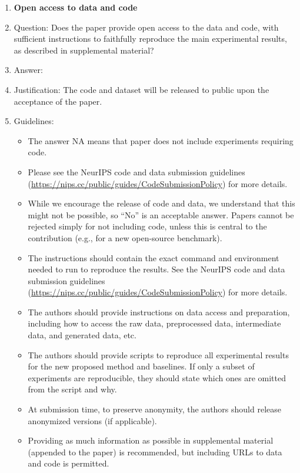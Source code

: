 \documentclass{article}
\begin{document}
\begin{enumerate}
\item {\bf Open access to data and code}
    \item[] Question: Does the paper provide open access to the data and code, with sufficient instructions to faithfully reproduce the main experimental results, as described in supplemental material?
    \item[] Answer: \answerNo{} %
    \item[] Justification: The code and dataset will be released to public upon the acceptance of the paper.
    \item[] Guidelines:
    \begin{itemize}
        \item The answer NA means that paper does not include experiments requiring code.
        \item Please see the NeurIPS code and data submission guidelines (\url{https://nips.cc/public/guides/CodeSubmissionPolicy}) for more details.
        \item While we encourage the release of code and data, we understand that this might not be possible, so “No” is an acceptable answer. Papers cannot be rejected simply for not including code, unless this is central to the contribution (e.g., for a new open-source benchmark).
        \item The instructions should contain the exact command and environment needed to run to reproduce the results. See the NeurIPS code and data submission guidelines (\url{https://nips.cc/public/guides/CodeSubmissionPolicy}) for more details.
        \item The authors should provide instructions on data access and preparation, including how to access the raw data, preprocessed data, intermediate data, and generated data, etc.
        \item The authors should provide scripts to reproduce all experimental results for the new proposed method and baselines. If only a subset of experiments are reproducible, they should state which ones are omitted from the script and why.
        \item At submission time, to preserve anonymity, the authors should release anonymized versions (if applicable).
        \item Providing as much information as possible in supplemental material (appended to the paper) is recommended, but including URLs to data and code is permitted.
    \end{itemize}



\end{enumerate}
\end{document}
